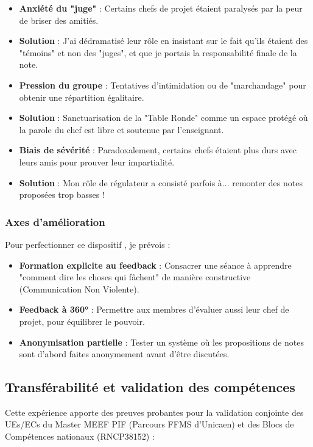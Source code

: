 \begin{itemize}[leftmargin=*]
    \item \textbf{Anxiété du "juge"} : Certains chefs de projet étaient paralysés par la peur de briser des amitiés.
    \item \textbf{Solution} : J'ai dédramatisé leur rôle en insistant sur le fait qu'ils étaient des "témoins" et non des "juges", et que je portais la responsabilité finale de la note.
    
    \item \textbf{Pression du groupe} : Tentatives d'intimidation ou de "marchandage" pour obtenir une répartition égalitaire.
    \item \textbf{Solution} : Sanctuarisation de la "Table Ronde" comme un espace protégé où la parole du chef est libre et soutenue par l'enseignant.
    
    \item \textbf{Biais de sévérité} : Paradoxalement, certains chefs étaient plus durs avec leurs amis pour prouver leur impartialité.
    \item \textbf{Solution} : Mon rôle de régulateur a consisté parfois à... remonter des notes proposées trop basses !
\end{itemize}

\subsubsection{Axes d'amélioration}
Pour perfectionner ce dispositif \parencite{ingenierie_digiforma}, je prévois :
\begin{itemize}
    \item \textbf{Formation explicite au feedback} : Consacrer une séance à apprendre "comment dire les choses qui fâchent" de manière constructive (Communication Non Violente).
    \item \textbf{Feedback à 360°} : Permettre aux membres d'évaluer aussi leur chef de projet, pour équilibrer le pouvoir.
    \item \textbf{Anonymisation partielle} : Tester un système où les propositions de notes sont d'abord faites anonymement avant d'être discutées.
\end{itemize}

\subsection{Transférabilité et validation des compétences}

Cette expérience apporte des preuves probantes pour la validation conjointe des UEs/ECs du Master MEEF PIF (Parcours FFMS d'Unicaen) et des Blocs de Compétences nationaux (RNCP38152) :

